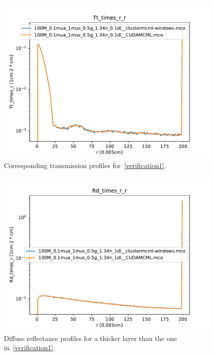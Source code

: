 \documentclass[]{article}
\begin{document}
\begin{figure}[ht!]
	\includegraphics[width=\linewidth]{img/verification2.pdf}
	\caption{Corresponding transmission profiles for~\autoref{verification1}.}
	\label{verification2}
\end{figure}

\begin{figure}[ht!]
\includegraphics[width=\linewidth]{img/verification3.pdf}
\caption{Diffuse reflectance profiles for a thicker layer than the one in~\autoref{verification1}.}
\label{verification3}
\end{figure}
\end{document}
